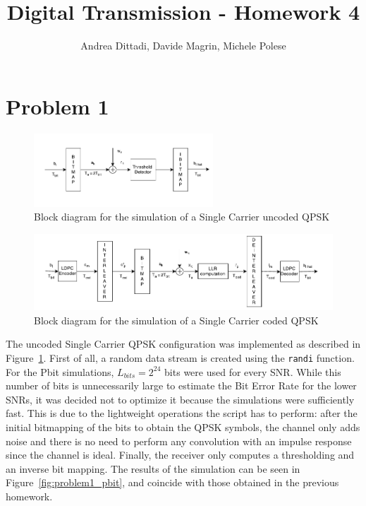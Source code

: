 \documentclass[10pt]{article}
\begin{document}
\title{Digital Transmission - Homework 4}
\author{Andrea Dittadi, Davide Magrin, Michele Polese}

\maketitle


\section*{Problem 1}


\begin{figure}
	\centering
	\includegraphics[width = 0.6\textwidth]{SC_uncoded}
	\caption{Block diagram for the simulation of a Single Carrier uncoded QPSK}
	\label{fig:problem1_scuncoded}
\end{figure}

\begin{figure}
	\centering
	\includegraphics[width = \textwidth]{SC_coded}
	\caption{Block diagram for the simulation of a Single Carrier coded QPSK}
	\label{fig:problem1_sccoded}
\end{figure}

The uncoded Single Carrier QPSK configuration was implemented as described in Figure~\ref{fig:problem1_scuncoded}. First of all, a random data stream is created using the \texttt{randi} function. For the Pbit simulations, $L_{bits} = 2^{24}$ bits were used for every SNR. While this number of bits is unnecessarily large to estimate the Bit Error Rate for the lower SNRs, it was decided not to optimize it because the simulations were sufficiently fast. This is due to the lightweight operations the script has to perform: after the initial bitmapping of the bits to obtain the QPSK symbols, the channel only adds noise and there is no need to perform any convolution with an impulse response since the channel is ideal. Finally, the receiver only computes a thresholding and an inverse bit mapping. The results of the simulation can be seen in Figure~\ref{fig:problem1_pbit}, and coincide with those obtained in the previous homework. %
\end{document}
